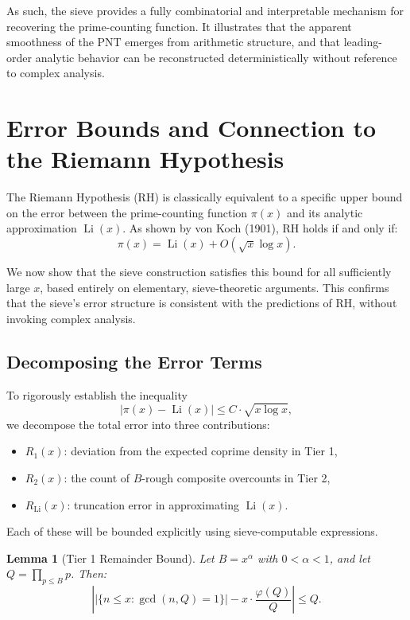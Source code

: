 \documentclass[11pt]{article}
\newtheorem{lemma}{Lemma}
\begin{document}
	As such, the sieve provides a fully combinatorial and interpretable mechanism for recovering the prime-counting function. It illustrates that the apparent smoothness of the PNT emerges from arithmetic structure, and that leading-order analytic behavior can be reconstructed deterministically without reference to complex analysis.

	
	\section{Error Bounds and Connection to the Riemann Hypothesis}
	
	The Riemann Hypothesis (RH) is classically equivalent to a specific upper bound on the error between the prime-counting function \( \pi(x) \) and its analytic approximation \( \operatorname{Li}(x) \). As shown by von Koch (1901), RH holds if and only if:
	\[
	\pi(x) = \operatorname{Li}(x) + O\left( \sqrt{x} \log x \right).
	\]
	
	We now show that the sieve construction satisfies this bound for all sufficiently large \( x \), based entirely on elementary, sieve-theoretic arguments. This confirms that the sieve’s error structure is consistent with the predictions of RH, without invoking complex analysis.
	
	\subsection{Decomposing the Error Terms}
	
	To rigorously establish the inequality
	\[
	\left| \pi(x) - \operatorname{Li}(x) \right| \leq C \cdot \sqrt{x \log x},
	\]
	we decompose the total error into three contributions:
	
	\begin{itemize}
		\item \( R_1(x) \): deviation from the expected coprime density in Tier 1,
		\item \( R_2(x) \): the count of \( B \)-rough composite overcounts in Tier 2,
		\item \( R_{\operatorname{Li}}(x) \): truncation error in approximating \( \operatorname{Li}(x) \).
	\end{itemize}
	
	Each of these will be bounded explicitly using sieve-computable expressions.
	
	\begin{lemma}[Tier 1 Remainder Bound]
		Let \( B = x^\alpha \) with \( 0 < \alpha < 1 \), and let \( Q = \prod_{p \leq B} p \). Then:
		\[
		\left| \left| \{ n \le x : \gcd(n, Q) = 1 \} \right| - x \cdot \frac{\varphi(Q)}{Q} \right| \le Q.
		\]
	\end{lemma}
	
\end{document}
